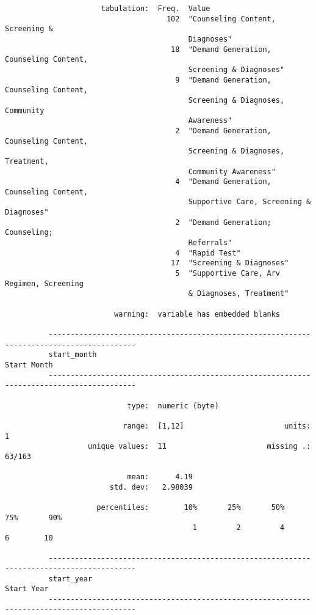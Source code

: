 \documentclass{article}
\begin{document}
\begin{verbatim}
                      tabulation:  Freq.  Value
                                     102  "Counseling Content, Screening &
                                          Diagnoses"
                                      18  "Demand Generation, Counseling Content,
                                          Screening & Diagnoses"
                                       9  "Demand Generation, Counseling Content,
                                          Screening & Diagnoses, Community
                                          Awareness"
                                       2  "Demand Generation, Counseling Content,
                                          Screening & Diagnoses, Treatment,
                                          Community Awareness"
                                       4  "Demand Generation, Counseling Content,
                                          Supportive Care, Screening & Diagnoses"
                                       2  "Demand Generation; Counseling;
                                          Referrals"
                                       4  "Rapid Test"
                                      17  "Screening & Diagnoses"
                                       5  "Supportive Care, Arv Regimen, Screening
                                          & Diagnoses, Treatment"
          
                         warning:  variable has embedded blanks
          
          ------------------------------------------------------------------------------------------
          start_month                                                                    Start Month
          ------------------------------------------------------------------------------------------
          
                            type:  numeric (byte)
          
                           range:  [1,12]                       units:  1
                   unique values:  11                       missing .:  63/163
          
                            mean:      4.19
                        std. dev:   2.98039
          
                     percentiles:        10%       25%       50%       75%       90%
                                           1         2         4         6        10
          
          ------------------------------------------------------------------------------------------
          start_year                                                                      Start Year
          ------------------------------------------------------------------------------------------
          

\end{verbatim}
\end{document}
